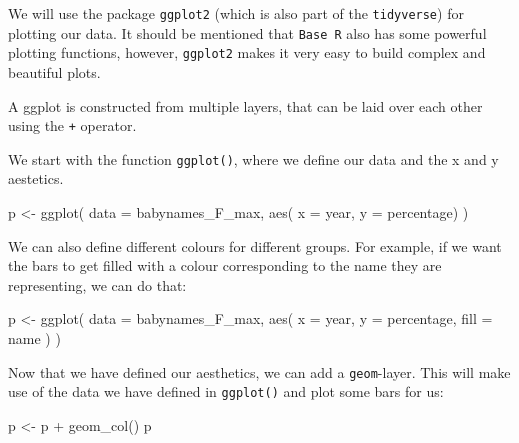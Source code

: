 \documentclass[
  letterpaper,
  DIV=11,
  numbers=noendperiod]{scrartcl}
\newenvironment{Shaded}{\begin{snugshade}}{\end{snugshade}}
\newcommand{\AttributeTok}[1]{\textcolor[rgb]{0.40,0.45,0.13}{#1}}
\newcommand{\FunctionTok}[1]{\textcolor[rgb]{0.28,0.35,0.67}{#1}}
\newcommand{\NormalTok}[1]{\textcolor[rgb]{0.00,0.23,0.31}{#1}}
\newcommand{\OtherTok}[1]{\textcolor[rgb]{0.00,0.23,0.31}{#1}}
\newcommand{\SpecialCharTok}[1]{\textcolor[rgb]{0.37,0.37,0.37}{#1}}
\begin{document}
We will use the package \texttt{ggplot2} (which is also part of the
\texttt{tidyverse}) for plotting our data. It should be mentioned that
\texttt{Base\ R} also has some powerful plotting functions, however,
\texttt{ggplot2} makes it very easy to build complex and beautiful
plots.

A ggplot is constructed from multiple layers, that can be laid over each
other using the \texttt{+} operator.

We start with the function \texttt{ggplot()}, where we define our data
and the x and y aestetics.

\begin{Shaded}
\begin{Highlighting}[]
\NormalTok{p }\OtherTok{\textless{}{-}} \FunctionTok{ggplot}\NormalTok{(}
  \AttributeTok{data =}\NormalTok{ babynames\_F\_max,}
  \FunctionTok{aes}\NormalTok{(}
    \AttributeTok{x =}\NormalTok{ year,}
    \AttributeTok{y =}\NormalTok{ percentage)}
\NormalTok{  )}
\end{Highlighting}
\end{Shaded}

We can also define different colours for different groups. For example,
if we want the bars to get filled with a colour corresponding to the
name they are representing, we can do that:

\begin{Shaded}
\begin{Highlighting}[]
\NormalTok{p }\OtherTok{\textless{}{-}} \FunctionTok{ggplot}\NormalTok{(}
  \AttributeTok{data =}\NormalTok{ babynames\_F\_max,}
  \FunctionTok{aes}\NormalTok{(}
    \AttributeTok{x =}\NormalTok{ year,}
    \AttributeTok{y =}\NormalTok{ percentage,}
    \AttributeTok{fill =}\NormalTok{ name}
\NormalTok{  )}
\NormalTok{)}
\end{Highlighting}
\end{Shaded}

Now that we have defined our aesthetics, we can add a
\texttt{geom}-layer. This will make use of the data we have defined in
\texttt{ggplot()} and plot some bars for us:

\begin{Shaded}
\begin{Highlighting}[]
\NormalTok{p }\OtherTok{\textless{}{-}}\NormalTok{ p }\SpecialCharTok{+}
  \FunctionTok{geom\_col}\NormalTok{()}
\NormalTok{p}
\end{Highlighting}
\end{Shaded}
\end{document}

